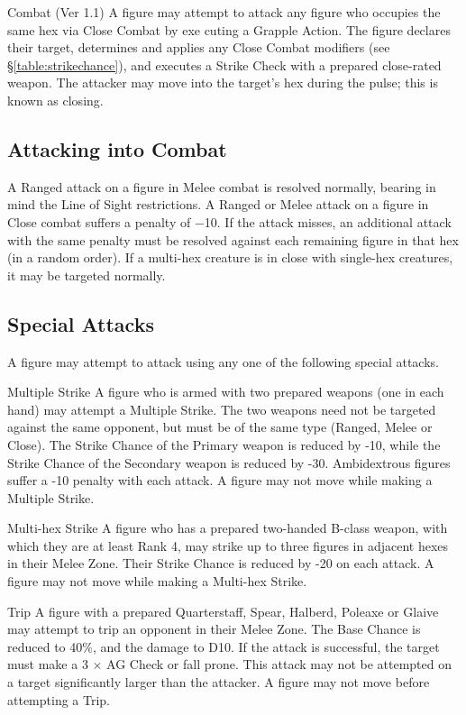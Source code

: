 \begin{Chapter}{Combat (Ver 1.1)}
A figure may attempt to attack any figure who occupies the same hex
via Close Combat by exe cuting a Grapple Action.  The figure declares
their target, determines and applies any Close Combat modifiers (see
\S\ref{table:strikechance}), and executes a Strike Check with a
prepared close-rated weapon.  The attacker may move into the target’s
hex during the pulse; this is known as closing.

\subsection{Attacking into Combat}

A Ranged attack on a figure in Melee combat is resolved normally,
bearing in mind the Line of Sight restrictions.  A Ranged or Melee
attack on a figure in Close combat suffers a penalty of −10.  If the
attack misses, an additional attack with the same penalty must be
resolved against each remaining figure in that hex (in a random
order). If a multi-hex creature is in close with single-hex creatures,
it may be targeted normally.

\subsection{Special Attacks}

A figure may attempt to attack using any one of the following special
attacks.

\begin{Description}
  
\item[Multiple Strike] A figure who is armed with two prepared weapons
  (one in each hand) may attempt a Multiple Strike.  The two weapons
  need not be targeted against the same opponent, but must be of the
  same type (Ranged, Melee or Close).  The Strike Chance of the
  Primary weapon is reduced by -10, while the Strike Chance of the
  Secondary weapon is reduced by -30.  Ambidextrous figures suffer a
  -10 penalty with each attack. A figure may not move while making a
  Multiple Strike.

\item[Multi-hex Strike] A figure who has a prepared two-handed B-class
  weapon, with which they are at least Rank 4, may strike up to three
  figures in adjacent hexes in their Melee Zone.  Their Strike Chance
  is reduced by -20 on each attack. A figure may not move while making
  a Multi-hex Strike.

\item[Trip] A figure with a prepared Quarterstaff, Spear, Halberd,
  Poleaxe or Glaive may attempt to trip an opponent in their Melee
  Zone. The Base Chance is reduced to 40\%, and the damage to D10.  If
  the attack is successful, the target must make a 3 × AG Check or
  fall prone.  This attack may not be attempted on a target
  significantly larger than the attacker. A figure may not move before
  attempting a Trip.


\end{Description}
\end{Chapter}
